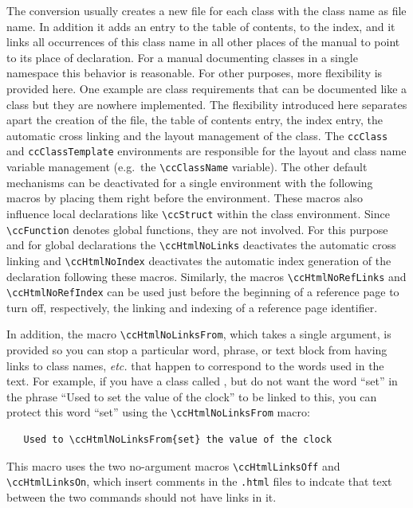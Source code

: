 \documentclass[11pt]{article}
\begin{document}
The conversion usually creates a new file for each class with the
class name as file name. In addition it adds an entry to the table of
contents, to the index, and it links all occurrences of this class name
in all other places of the manual to point to its place of
declaration. For a manual documenting classes in a single namespace
this behavior is reasonable. For other purposes, more flexibility is
provided here. One example are class requirements that can be
documented like a class but they are nowhere implemented. The
flexibility introduced here separates apart the creation of the file,
the table of contents entry, the index entry, the automatic cross
linking and the layout management of the class. The \verb+ccClass+ and
\verb+ccClassTemplate+ environments are responsible for the layout and
class name variable management (e.g.~the \verb+\ccClassName+ variable).
The other default mechanisms can be deactivated for a single
environment with the following macros by placing them right before the
environment. These macros also influence local declarations like
\verb+\ccStruct+ within the class environment.  Since
\verb+\ccFunction+ denotes global functions, they are not involved.
For this purpose and for global declarations the \verb+\ccHtmlNoLinks+
deactivates the automatic cross linking and \verb+\ccHtmlNoIndex+
deactivates the automatic index generation of the declaration
following these macros.  Similarly, the macros \verb+\ccHtmlNoRefLinks+
and \verb+\ccHtmlNoRefIndex+ can be used just before the beginning of
a reference page to turn off, respectively, the linking and indexing
of a reference page identifier.

In addition, the macro \verb+\ccHtmlNoLinksFrom+, which takes a single
argument, is provided so you can stop a particular word, phrase, or
text block from having links to class names, {\em etc.} that happen
to correspond to the words used in the text.  For example, if you have
a class called , but do not want the word ``set'' in the
phrase ``Used to set the value of the clock''  to be linked to this,
you can protect this word ``set'' using the \verb+\ccHtmlNoLinksFrom+ macro:

\begin{verbatim}
   Used to \ccHtmlNoLinksFrom{set} the value of the clock
\end{verbatim}

This macro uses the two no-argument macros \verb+\ccHtmlLinksOff+ and
\verb+\ccHtmlLinksOn+, which insert comments in the {\tt .html} files
to indcate that text between the two commands should not have links
in it.
\end{document}
